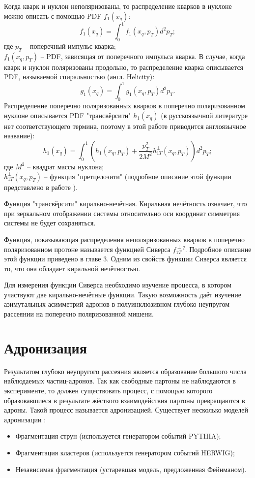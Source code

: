 \documentclass{extreport}
\begin{document}
Когда кварк и нуклон неполяризованы, то распределение кварков в нуклоне можно описать с помощью PDF $f_1(x_q)$:
\begin{equation}
	f_1(x_q) = \int_{0}^{1} f_1(x_q, p_T) d^2 p_T;
\end{equation}
где $p_T$ -- поперечный импульс кварка; \\
$f_1(x_q, p_T)$ -- PDF, зависящая от поперечного импульса кварка.
В случае, когда кварк и нуклон поляризованы продольно, то распределение кварка описывается PDF, называемой спиральностью (англ. Helicity):
\begin{equation}
	g_1(x_q) = \int_{0}^{1} g_1(x_q, p_T) d^2 p_T.
\end{equation}
Распределение поперечно поляризованных кварков в поперечно поляризованном нуклоне описывается PDF "трансвёрсити" $h_1(x_q)$ (в русскоязычной литературе нет соответствующего термина, поэтому в этой работе приводится англоязычное название):
\begin{equation}
	h_1(x_q) = \int_{0}^{1} (h_1(x_q, p_T) + \frac{p_T^2}{2M^2} h_{1T}^{\perp}(x_q, p_T) )d^2 p_T;
\end{equation} 
где $M^2$ -- квадрат массы нуклона; \\
$ h_{1T}^{\perp}(x_q, p_T)$ -- функция "претцелозити" (подробное описание этой функции представлено в работе \cite{Chai_2019}).


Функция "трансвёрсити" кирально-нечётная. Киральная нечётность означает, что при зеркальном отображении системы относительно оси координат симметрия системы не будет сохраняться. 

Функция, показывающая распределения неполяризованных кварков в поперечно поляризованном протоне называется функцией Сиверса $f_{1T}^{\perp q}$. Подробное описание этой функции приведено в главе 3. Одним из свойств функции Сиверса является то, что она обладает киральной нечётностью.

Для измерения функции Сиверса необходимо изучение процесса, в котором участвуют две кирально-нечётные функции. Такую возможность даёт изучение азимутальных асимметрий адронов в полуинклюзивном глубоко неупругом рассеянии на поперечно поляризованной мишени. 


\section{Адронизация}
Результатом глубоко неупругого рассеяния является образование большого числа наблюдаемых частиц-адронов. Так как свободные партоны не наблюдаются в эксперименте, то должен существовать процесс, с помощью которого образовавшиеся в результате жёсткого взаимодействия партоны превращаются в адроны. Такой процесс называется адронизацией. Существует несколько моделей адронизации  \cite{Hadronization}:
\begin{itemize}
\item Фрагментация струн (используется генератором событий PYTHIA);
\item Фрагментация кластеров (используется генератором событий HERWIG);
\item Независимая фрагментация (устаревшая модель, предложенная Фейнманом).
\end{itemize}
 
\end{document}

